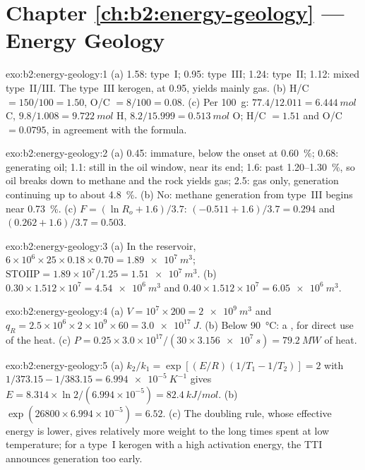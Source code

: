 \section*{Chapter \ref{ch:b2:energy-geology} --- Energy Geology}

\begin{solution}{exo:b2:energy-geology:1}
(a) 1.58: type~I; 0.95: type~III; 1.24: type~II; 1.12: mixed type~II/III. The type~III kerogen, at
0.95, yields mainly gas. (b) H/C $= 150/100 = 1.50$, O/C $= 8/100 = 0.08$. (c) Per \qty{100}{g}:
$77.4/12.011 = \qty{6.444}{mol}$ C, $9.8/1.008 = \qty{9.722}{mol}$ H, $8.2/15.999 =
\qty{0.513}{mol}$ O; H/C $= 1.51$ and O/C $= 0.0795$, in agreement with the formula.
\end{solution}

\begin{solution}{exo:b2:energy-geology:2}
(a) 0.45: immature, below the onset at \qty{0.60}{\percent}; 0.68: generating oil; 1.1: still in the
oil window, near its end; 1.6: past 1.20--\qty{1.30}{\percent}, so oil breaks down to methane and the
rock yields gas; 2.5: gas only, generation continuing up to about \qty{4.8}{\percent}. (b) No: methane
generation from type~III begins near \qty{0.73}{\percent}. (c) $F = (\ln R_o + 1.6)/3.7$: $(-0.511 +
1.6)/3.7 = 0.294$ and $(0.262 + 1.6)/3.7 = 0.503$.
\end{solution}

\begin{solution}{exo:b2:energy-geology:3}
(a) In the reservoir, $6 \times 10^6 \times 25 \times 0.18 \times 0.70 = \qty{1.89e7}{m^3}$;
$\mathrm{STOIIP} = 1.89 \times 10^7/1.25 = \qty{1.51e7}{m^3}$. (b) $0.30 \times 1.512 \times 10^7 =
\qty{4.54e6}{m^3}$ and $0.40 \times 1.512 \times 10^7 = \qty{6.05e6}{m^3}$.
\end{solution}

\begin{solution}{exo:b2:energy-geology:4}
(a) $V = 10^7 \times 200 = \qty{2e9}{m^3}$ and $q_R = 2.5 \times 10^6 \times 2 \times 10^9 \times 60
= \qty{3.0e17}{J}$. (b) Below \qty{90}{\celsius}: a , for direct use of the
heat. (c) $P = 0.25 \times 3.0 \times 10^{17}/(30 \times \qty{3.156e7}{s}) = \qty{79.2}{MW}$ of heat.
\end{solution}

\begin{solution}{exo:b2:energy-geology:5}
(a) $k_2/k_1 = \exp[(E/R)(1/T_1 - 1/T_2)] = 2$ with $1/373.15 - 1/383.15 = \qty{6.994e-5}{K^{-1}}$
gives $E = 8.314 \times \ln 2/(6.994 \times 10^{-5}) = \qty{82.4}{kJ/mol}$. (b) $\exp(26800 \times
6.994 \times 10^{-5}) = 6.52$. (c) The doubling rule, whose effective energy is lower, gives
relatively more weight to the long times spent at low temperature; for a type~I kerogen with a high
activation energy, the TTI announces generation too early.
\end{solution}

